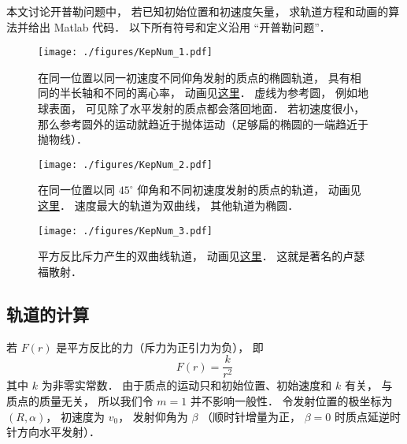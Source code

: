 

本文讨论开普勒问题中， 若已知初始位置和初速度矢量， 求轨道方程和动画的算法并给出 Matlab 代码． 以下所有符号和定义沿用 “开普勒问题”．
\begin{figure}[ht]
\centering
\texttt{[image: ./figures/KepNum\_1.pdf]}
\caption{在同一位置以同一初速度不同仰角发射的质点的椭圆轨道， 具有相同的半长轴和不同的离心率， 动画见\href{https://wuli.wiki/apps/Kepler.html}{这里}． 虚线为参考圆， 例如地球表面， 可见除了水平发射的质点都会落回地面． 若初速度很小， 那么参考圆外的运动就趋近于抛体运动（足够扁的椭圆的一端趋近于抛物线）．} \label{KepNum_fig1}
\end{figure}

\begin{figure}[ht]
\centering
\texttt{[image: ./figures/KepNum\_2.pdf]}
\caption{在同一位置以同 $45^\circ$ 仰角和不同初速度发射的质点的轨道， 动画见\href{https://wuli.wiki/apps/Kepler2.html}{这里}． 速度最大的轨道为双曲线， 其他轨道为椭圆．} \label{KepNum_fig2}
\end{figure}

\begin{figure}[ht]
\centering
\texttt{[image: ./figures/KepNum\_3.pdf]}
\caption{平方反比斥力产生的双曲线轨道， 动画见\href{https://wuli.wiki/apps/Kepler3.html}{这里}． 这就是著名的卢瑟福散射．} \label{KepNum_fig3}
\end{figure}


\subsection{轨道的计算}
若 $F(r)$ 是平方反比的力（斥力为正引力为负）， 即
\begin{equation}
F(r) = \frac{k}{r^2}
\end{equation}
其中 $k$ 为非零实常数． 由于质点的运动只和初始位置、初始速度和 $k$ 有关， 与质点的质量无关， 所以我们令 $m=1$ 并不影响一般性． 令发射位置的极坐标为 $(R,\alpha)$， 初速度为 $v_0$， 发射仰角为 $\beta$ （顺时针增量为正， $\beta=0$ 时质点延逆时针方向水平发射）．

